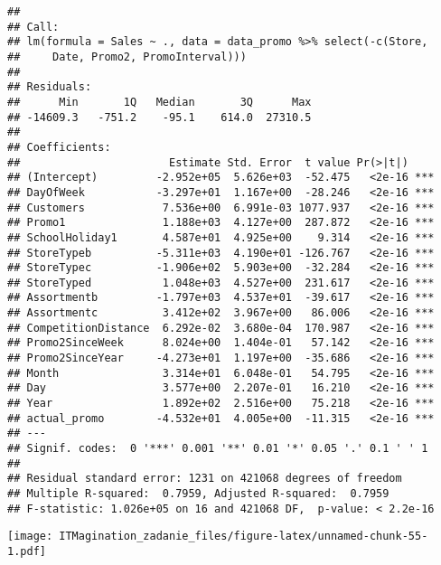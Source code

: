\documentclass[]{article}
\newenvironment{Shaded}{\begin{snugshade}}{\end{snugshade}}
\newcommand{\DataTypeTok}[1]{\textcolor[rgb]{0.13,0.29,0.53}{#1}}
\newcommand{\KeywordTok}[1]{\textcolor[rgb]{0.13,0.29,0.53}{\textbf{#1}}}
\newcommand{\NormalTok}[1]{#1}
\newcommand{\OperatorTok}[1]{\textcolor[rgb]{0.81,0.36,0.00}{\textbf{#1}}}
\newcommand{\StringTok}[1]{\textcolor[rgb]{0.31,0.60,0.02}{#1}}
\begin{document}
\begin{verbatim}
## 
## Call:
## lm(formula = Sales ~ ., data = data_promo %>% select(-c(Store, 
##     Date, Promo2, PromoInterval)))
## 
## Residuals:
##      Min       1Q   Median       3Q      Max 
## -14609.3   -751.2    -95.1    614.0  27310.5 
## 
## Coefficients:
##                       Estimate Std. Error  t value Pr(>|t|)    
## (Intercept)         -2.952e+05  5.626e+03  -52.475   <2e-16 ***
## DayOfWeek           -3.297e+01  1.167e+00  -28.246   <2e-16 ***
## Customers            7.536e+00  6.991e-03 1077.937   <2e-16 ***
## Promo1               1.188e+03  4.127e+00  287.872   <2e-16 ***
## SchoolHoliday1       4.587e+01  4.925e+00    9.314   <2e-16 ***
## StoreTypeb          -5.311e+03  4.190e+01 -126.767   <2e-16 ***
## StoreTypec          -1.906e+02  5.903e+00  -32.284   <2e-16 ***
## StoreTyped           1.048e+03  4.527e+00  231.617   <2e-16 ***
## Assortmentb         -1.797e+03  4.537e+01  -39.617   <2e-16 ***
## Assortmentc          3.412e+02  3.967e+00   86.006   <2e-16 ***
## CompetitionDistance  6.292e-02  3.680e-04  170.987   <2e-16 ***
## Promo2SinceWeek      8.024e+00  1.404e-01   57.142   <2e-16 ***
## Promo2SinceYear     -4.273e+01  1.197e+00  -35.686   <2e-16 ***
## Month                3.314e+01  6.048e-01   54.795   <2e-16 ***
## Day                  3.577e+00  2.207e-01   16.210   <2e-16 ***
## Year                 1.892e+02  2.516e+00   75.218   <2e-16 ***
## actual_promo        -4.532e+01  4.005e+00  -11.315   <2e-16 ***
## ---
## Signif. codes:  0 '***' 0.001 '**' 0.01 '*' 0.05 '.' 0.1 ' ' 1
## 
## Residual standard error: 1231 on 421068 degrees of freedom
## Multiple R-squared:  0.7959, Adjusted R-squared:  0.7959 
## F-statistic: 1.026e+05 on 16 and 421068 DF,  p-value: < 2.2e-16
\end{verbatim}

\begin{Shaded}
\end{Shaded}

\texttt{[image: ITMagination\_zadanie\_files/figure-latex/unnamed-chunk-55-1.pdf]}
\end{document}
